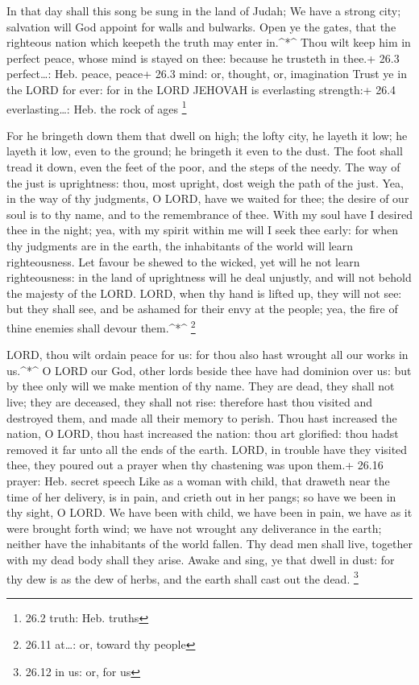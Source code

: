  In that day shall this song be sung in the land of Judah;
We have a strong city; salvation will God appoint for walls and
bulwarks.  Open ye the gates, that the righteous nation
which keepeth the truth may enter in.\^{}*\^{}  Thou wilt
keep him in perfect peace, whose mind is stayed on thee: because he
trusteth in thee.+ 26.3 perfect\ldots: Heb. peace, peace+ 26.3 mind: or,
thought, or, imagination  Trust ye in the LORD for ever: for
in the LORD JEHOVAH is everlasting strength:+ 26.4 everlasting\ldots:
Heb. the rock of ages \footnote{26.2 truth: Heb. truths}

 For he bringeth down them that dwell on high; the lofty
city, he layeth it low; he layeth it low, even to the ground; he
bringeth it even to the dust.  The foot shall tread it down,
even the feet of the poor, and the steps of the needy.  The
way of the just is uprightness: thou, most upright, dost weigh the path
of the just.  Yea, in the way of thy judgments, O LORD, have
we waited for thee; the desire of our soul is to thy name, and to the
remembrance of thee.  With my soul have I desired thee in
the night; yea, with my spirit within me will I seek thee early: for
when thy judgments are in the earth, the inhabitants of the world will
learn righteousness.  Let favour be shewed to the wicked,
yet will he not learn righteousness: in the land of uprightness will he
deal unjustly, and will not behold the majesty of the LORD.
 LORD, when thy hand is lifted up, they will not see: but
they shall see, and be ashamed for their envy at the people; yea, the
fire of thine enemies shall devour them.\^{}*\^{} \footnote{26.11
  at\ldots: or, toward thy people}

 LORD, thou wilt ordain peace for us: for thou also hast
wrought all our works in us.\^{}*\^{}  O LORD our God,
other lords beside thee have had dominion over us: but by thee only will
we make mention of thy name.  They are dead, they shall not
live; they are deceased, they shall not rise: therefore hast thou
visited and destroyed them, and made all their memory to perish.
 Thou hast increased the nation, O LORD, thou hast
increased the nation: thou art glorified: thou hadst removed it far unto
all the ends of the earth.  LORD, in trouble have they
visited thee, they poured out a prayer when thy chastening was upon
them.+ 26.16 prayer: Heb. secret speech  Like as a woman
with child, that draweth near the time of her delivery, is in pain, and
crieth out in her pangs; so have we been in thy sight, O LORD.
 We have been with child, we have been in pain, we have as
it were brought forth wind; we have not wrought any deliverance in the
earth; neither have the inhabitants of the world fallen. 
Thy dead men shall live, together with my dead body shall they arise.
Awake and sing, ye that dwell in dust: for thy dew is as the dew of
herbs, and the earth shall cast out the dead. \footnote{26.12 in us: or,
  for us}

